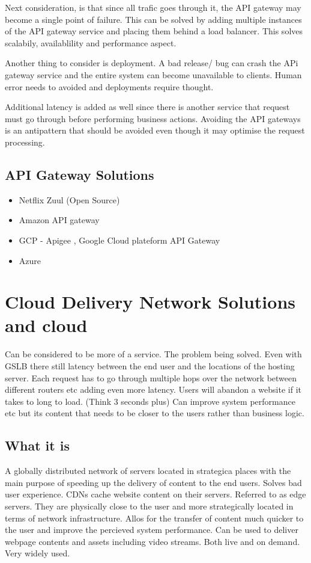 \documentclass[a4paper, 11pt]{book}
\begin{document}
    Next consideration, is that since all trafic goes through it, the API gateway may become a single point of failure.
    This can be solved by adding multiple instances of the API gateway service and placing them behind a load balancer.
    This solves scalabily, availablility and performance aspect.

    Another thing to consider is deployment. A bad release/ bug can crash the APi gateway service and the entire system can become unavailable to clients.
    Human error needs to avoided and deployments require thought.

    Additional latency is added as well since there is another service that request must go through before performing business actions.
    Avoiding the API gateways is an antipattern that should be avoided even though it may optimise the request processing.

    \subsection{API Gateway Solutions}
    \begin{itemize}
        \item Netflix Zuul (Open Source)
        \item Amazon API gateway
        \item GCP - Apigee , Google Cloud plateform API Gateway
        \item Azure
    \end{itemize}


    \section{Cloud Delivery Network Solutions and cloud}
    Can be considered to be more of a service.
    The problem being solved. Even with GSLB there still latency between the end user and the locations of the hosting server.
    Each request has to go through multiple hops over the network between different routers etc adding even more latency.
    Users will abandon a website if it takes to long to load. (Think 3 seconds plus)
    Can improve system performance etc but its content that needs to be closer to the users rather than business logic.

    \subsection{What it is}
    A globally distributed network of servers located in strategica places with the main purpose of speeding up the delivery of content to the end users.
    Solves bad user experience.
    CDNs cache website content on their servers. Referred to as edge servers. They are physically close to the user and more strategically located in terms of network infrastructure.
    Allos for the transfer of content much quicker to the user and improve the percieved system performance.
    Can be used to deliver webpage contents and assets including video streams. Both live and on demand.
    Very widely used.
\end{document}
